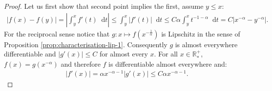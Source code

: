 \documentclass[11pt,a4paper]{article}
\newcommand{\RRP}{\mathbb{R}^+_*}
\newcommand{\dd}{\mathop{}\!\mathrm{d}}
\begin{document}
\begin{proof}
    Let us first show that second point implies the first, assume $y \leq x$:
    \begin{align*}
        |f(x) - f(y)| = \left|\int_y^x f'(t) \dd t\right| \leq \int_y^x |f'(t)| \dd t \leq C\alpha \int_y^x t^{-1-\alpha} \dd t = C|x^{-\alpha} - y^{-\alpha}|.
    \end{align*}
    For the reciprocal sense notice that $g : x \mapsto f\left(x^{-\frac{1}{\alpha}} \right)$ is Lipschitz in the sense of Proposition \ref{prop:characterisation-lip-1}. Consequently $g$ is almost everywhere differentiable and $|g'(x)| \leq C$ for almost every $x$. For all $x \in \RRP$, $f(x) = g\left(x^{-\alpha} \right)$ and therefore $f$ is differentiable almost everywhere and:
    \begin{align*}
        |f'(x)| = \alpha x^{-\alpha - 1}|g'(x)| \leq C\alpha x^{-\alpha-1}.
    \end{align*}
\end{proof}
\end{document}
